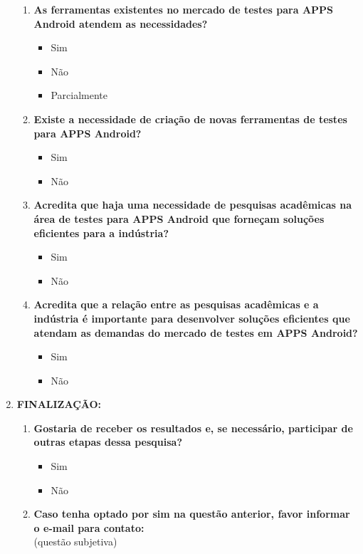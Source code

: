 \begin{enumerate}[label=\bf A\arabic*,leftmargin=1.8cm]
\begin{enumerate}[label= \arabic*]
    \item \textbf{As ferramentas existentes no mercado de testes para \ac{APPS} Android atendem as necessidades?}
    \begin{itemize}
        \item Sim
        \item Não
        \item Parcialmente
    \end{itemize}   

    \item \textbf{Existe a necessidade de criação de novas ferramentas de testes para \ac{APPS} Android?}
    \begin{itemize}
        \item Sim
        \item Não
    \end{itemize}
    
    \item \textbf{Acredita que haja uma necessidade de pesquisas acadêmicas na área de testes para \ac{APPS} Android que forneçam soluções eficientes para a indústria?}
    \begin{itemize}
        \item Sim
        \item Não
    \end{itemize}
     
    \item \textbf{Acredita que a relação entre as pesquisas acadêmicas e a indústria é importante para desenvolver soluções eficientes que atendam as demandas do mercado de testes em \ac{APPS} Android?}
    \begin{itemize}
        \item Sim
        \item Não
    \end{itemize}
    
    \end{enumerate}
    
    
    \item \textbf{FINALIZAÇÃO:}
    
    \begin{enumerate}[label= \arabic*]
     
     \item \textbf{Gostaria de receber os resultados e, se necessário, participar de outras etapas dessa pesquisa?}
     \begin{itemize}
        \item Sim
        \item Não
    \end {itemize}
    
    \item \textbf{Caso tenha optado por sim na questão anterior, favor informar o e-mail para contato:}\\
    (questão subjetiva)
     
    \end{enumerate}
    
\end{enumerate}


